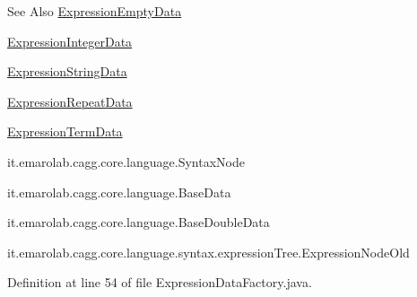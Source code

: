 \begin{DoxySeeAlso}{See Also}
\hyperlink{classit_1_1emarolab_1_1cagg_1_1core_1_1language_1_1syntax_1_1expressionTree_1_1ExpressionDataFactory_1_1ExpressionEmptyData}{Expression\-Empty\-Data} 

\hyperlink{classit_1_1emarolab_1_1cagg_1_1core_1_1language_1_1syntax_1_1expressionTree_1_1ExpressionDataFactory_1_1ExpressionIntegerData}{Expression\-Integer\-Data} 

\hyperlink{classit_1_1emarolab_1_1cagg_1_1core_1_1language_1_1syntax_1_1expressionTree_1_1ExpressionDataFactory_1_1ExpressionStringData}{Expression\-String\-Data} 

\hyperlink{classit_1_1emarolab_1_1cagg_1_1core_1_1language_1_1syntax_1_1expressionTree_1_1ExpressionDataFactory_1_1ExpressionRepeatData}{Expression\-Repeat\-Data} 

\hyperlink{classit_1_1emarolab_1_1cagg_1_1core_1_1language_1_1syntax_1_1expressionTree_1_1ExpressionDataFactory_1_1ExpressionTermData}{Expression\-Term\-Data} 

it.\-emarolab.\-cagg.\-core.\-language.\-Syntax\-Node 

it.\-emarolab.\-cagg.\-core.\-language.\-Base\-Data 

it.\-emarolab.\-cagg.\-core.\-language.\-Base\-Double\-Data 

it.\-emarolab.\-cagg.\-core.\-language.\-syntax.\-expression\-Tree.\-Expression\-Node\-Old 
\end{DoxySeeAlso}


Definition at line 54 of file Expression\-Data\-Factory.\-java.



